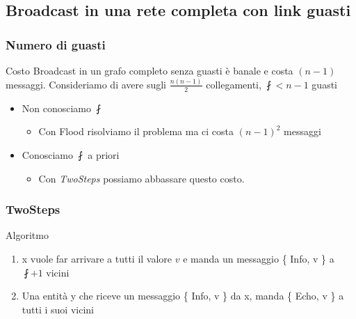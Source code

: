 	\subsection{Broadcast in una rete completa con link guasti}
		
		\begin{frame}
			\frametitle{Numero di guasti}
			\begin{block}{Costo}
				Broadcast in un grafo completo senza guasti è banale e costa $(n-1)$ messaggi. Consideriamo di avere sugli $\frac{n(n-1)}{2}$ collegamenti, $\fint < n-1$ guasti
				\begin{itemize}
					\item Non conosciamo $\fint$
					\begin{itemize}
						\item Con Flood risolviamo il problema ma ci costa $(n-1)^2$ messaggi
					\end{itemize}
					\item Conosciamo $\fint$ a priori
					\begin{itemize}
						\item Con \emph{TwoSteps} possiamo abbassare questo costo.
					\end{itemize}
				\end{itemize}				
			\end{block}
		\end{frame}
	
		\begin{frame}
			\frametitle{TwoSteps}
			\begin{block}{Algoritmo}
				\begin{enumerate}
					\item x vuole far arrivare a tutti il valore $v$ e manda un messaggio \{ Info, v \} a $\fint + 1$ vicini
					\item Una entità y che riceve un messaggio \{ Info, v \} da x, manda \{ Echo, v \} a tutti i suoi vicini
				\end{enumerate}				
			\end{block}
		\end{frame}
	
